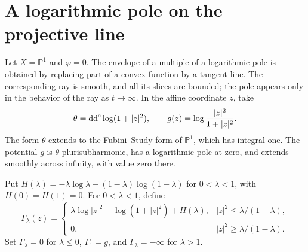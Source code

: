 \section{A logarithmic pole on the projective line}

Let $X=\mathbb P^1$ and $\varphi=0$. The envelope of a multiple of a logarithmic pole is obtained by replacing part of a convex function by a tangent line. The corresponding ray is smooth, and all its slices are bounded; the pole appears only in the behavior of the ray as $t\to\infty$. In the affine coordinate $z$, take
\[
 \theta=\mathrm{dd}^{\mathrm{c}}\log(1+|z|^2),\qquad
 g(z)=\log\frac{|z|^2}{1+|z|^2}.
\]
The form $\theta$ extends to the Fubini--Study form of $\mathbb P^1$, which has integral one. The potential $g$ is $\theta$-plurisubharmonic, has a logarithmic pole at zero, and extends smoothly across infinity, with value zero there.

Put $H(\lambda)=-\lambda\log\lambda-(1-\lambda)\log(1-\lambda)$ for $0<\lambda<1$, with $H(0)=H(1)=0$. For $0<\lambda<1$, define
\begin{equation}\label{eq:pone-explicit-model}
 \Gamma_\lambda(z)=
 \begin{cases}
 \lambda\log|z|^2-\log(1+|z|^2)+H(\lambda),
       & |z|^2\leq\lambda/(1-\lambda),\\
 0,    & |z|^2\geq\lambda/(1-\lambda).
 \end{cases}
\end{equation}
Set $\Gamma_\lambda=0$ for $\lambda\leq0$, $\Gamma_1=g$, and $\Gamma_\lambda=-\infty$ for $\lambda>1$.

